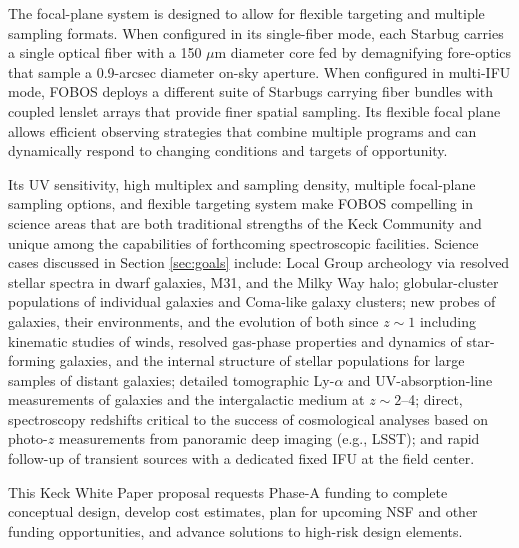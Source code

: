 The focal-plane system is designed to allow for flexible targeting
and multiple sampling formats. When configured in its single-fiber
mode, each Starbug carries a single optical fiber with a 150 $\mu$m
diameter core fed by demagnifying fore-optics that sample a
0.9-arcsec diameter on-sky aperture. When configured in multi-IFU
mode, FOBOS deploys a different suite of Starbugs carrying fiber
bundles with coupled lenslet arrays that provide finer spatial
sampling.  Its flexible focal
plane allows efficient observing strategies that combine multiple
programs and can dynamically respond to changing conditions and
targets of opportunity.


Its UV sensitivity, high multiplex and sampling density, multiple
focal-plane sampling options, and flexible targeting system make
FOBOS compelling in science areas that are both traditional strengths
of the Keck Community and unique among the capabilities of
forthcoming spectroscopic facilities. Science cases discussed in
Section \ref{sec:goals} include: Local Group archeology via resolved
stellar spectra in dwarf galaxies, M31, and the Milky Way halo;
globular-cluster populations of individual galaxies and Coma-like
galaxy clusters; new probes of galaxies, their environments, and the
evolution of both since $z \sim 1$ including kinematic studies of
winds, resolved gas-phase properties and dynamics of star-forming
galaxies, and the internal structure of stellar populations for large
samples of distant galaxies; detailed tomographic Ly-$\alpha$ and
UV-absorption-line measurements of galaxies and the intergalactic
medium at $z \sim 2$--4; direct, spectroscopy redshifts critical to
the success of cosmological analyses based on photo-$z$ measurements
from panoramic deep imaging (e.g., LSST); and rapid follow-up of
transient sources with a dedicated fixed IFU at the field center.

This Keck White Paper proposal requests Phase-A funding to complete conceptual design, develop cost estimates, plan for upcoming NSF and other funding opportunities, and advance solutions to high-risk design elements.  

